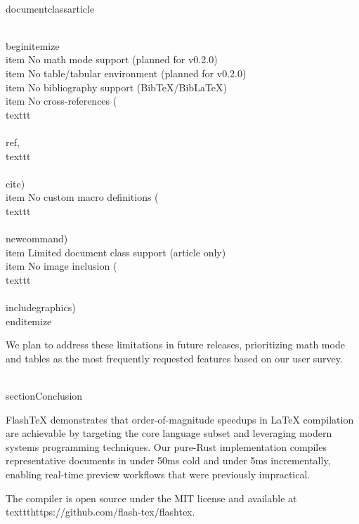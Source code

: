 \\documentclass{article}
\begin{document}
\\begin{itemize}
  \\item No math mode support (planned for v0.2.0)
  \\item No table/tabular environment (planned for v0.2.0)
  \\item No bibliography support (BibTeX/BibLaTeX)
  \\item No cross-references (\\texttt{\\\\ref}, \\texttt{\\\\cite})
  \\item No custom macro definitions (\\texttt{\\\\newcommand})
  \\item Limited document class support (article only)
  \\item No image inclusion (\\texttt{\\\\includegraphics})
\\end{itemize}

We plan to address these limitations in future releases, prioritizing
math mode and tables as the most frequently requested features based on
our user survey.

\\section{Conclusion}

FlashTeX demonstrates that order-of-magnitude speedups in LaTeX compilation
are achievable by targeting the core language subset and leveraging modern
systems programming techniques. Our pure-Rust implementation compiles
representative documents in under 50ms cold and under 5ms incrementally,
enabling real-time preview workflows that were previously impractical.

The compiler is open source under the MIT license and available at
\\texttt{https://github.com/flash-tex/flashtex}.

\
\end{document}
